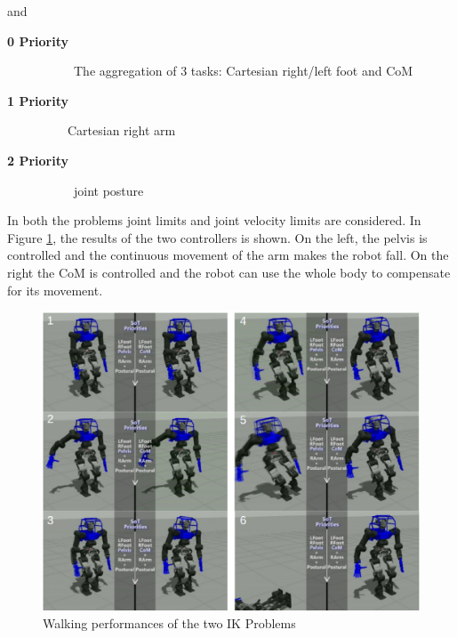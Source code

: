 and
\begin{description}
\item[\bf{0 Priority}] \ \ \ \ \ The aggregation of 3 tasks: Cartesian right/left foot and CoM 
\item[\bf{1 Priority}] \ \ \ \  Cartesian right arm
\item[\bf{2 Priority}] \ \ \ \ \ joint posture 
\end{description}
In both the problems joint limits and joint velocity limits are considered.
In Figure \ref{walk_snapshot}, the results of the two controllers is shown. On the left, the pelvis is controlled and the continuous movement of the arm makes the robot fall. On the right the CoM is controlled and the robot can use the whole body to compensate for its movement. 
\begin{figure}[!h]
\vspace{2 mm}
\centering
\includegraphics[width=\textwidth]{gfx/walking_snapshot.eps}
\caption{Walking performances of the two IK Problems}
\label{walk_snapshot}
\end{figure}

